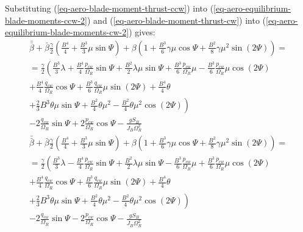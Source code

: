 Substituting (\ref{eq-aero-blade-moment-thrust-ccw}) into (\ref{eq-aero-equilibrium-blade-moments-ccw-2}) and (\ref{eq-aero-blade-moment-thrust-cw}) into (\ref{eq-aero-equilibrium-blade-moments-cw-2}) gives:
\begin{multline}
  \label{eq-aero-flapping-coefs-ccw-1}
  \bar{\bar \beta} + \bar \beta \frac{\gamma}{2}
  \left( \frac{B^4}{4} + \frac{B^3}{3} \mu \sin \Psi \right)
  + \beta \left(
    1 + \frac{B^3}{6} \gamma \mu \cos \Psi
    + \frac{B^2}{8} \gamma \mu^2 \sin \left( 2 \Psi \right)
  \right)
  = \\ =
  \frac{\gamma}{2}
  \left(
      \frac{B^3}{3} \lambda
    + \frac{B^4}{4} \frac{p_{cw}}{\Omega_R} \sin \Psi
    + \frac{B^2}{2} \lambda \mu \sin \Psi
    + \frac{B^3}{6} \frac{p_{cw}}{\Omega_R} \mu
    - \frac{B^3}{6} \frac{p_{cw}}{\Omega_R} \mu \cos \left( 2 \Psi \right)
    \right.
    \\
    + \frac{B^4}{4} \frac{q_{cw}}{\Omega_R} \cos \Psi
    + \frac{B^3}{6} \frac{q_{cw}}{\Omega_R} \mu \sin \left( 2 \Psi \right)
    + \frac{B^4}{4} \theta
    \\
    \left.
    + \frac{2}{3} B^3 \theta \mu \sin \Psi
    + \frac{B^2}{4} \theta \mu^2
    - \frac{B^2}{4} \theta \mu^2 \cos \left( 2 \Psi \right)
  \right)
  \\
  - 2 \frac{q_{cw}}{\Omega_R} \sin \Psi
  + 2 \frac{p_{cw}}{\Omega_R} \cos \Psi
  - \frac{ g S_B }{ J_B \Omega_R^2 }
\end{multline}
\begin{multline}
  \label{eq-aero-flapping-coefs-cw-1}
  \bar{\bar \beta} + \bar \beta \frac{\gamma}{2}
  \left( \frac{B^4}{4} + \frac{B^3}{3} \mu \sin \Psi \right)
  + \beta \left(
    1 + \frac{B^3}{6} \gamma \mu \cos \Psi
    + \frac{B^2}{8} \gamma \mu^2 \sin \left( 2 \Psi \right)
  \right)
  = \\ =
  \frac{\gamma}{2}
  \left(
      \frac{B^3}{3} \lambda
    - \frac{B^4}{4} \frac{p_{cw}}{\Omega_R} \sin \Psi
    + \frac{B^2}{2} \lambda \mu \sin \Psi
    - \frac{B^3}{6} \frac{p_{cw}}{\Omega_R} \mu
    + \frac{B^3}{6} \frac{p_{cw}}{\Omega_R} \mu \cos \left( 2 \Psi \right)
    \right.
    \\
    + \frac{B^4}{4} \frac{q_{cw}}{\Omega_R} \cos \Psi
    + \frac{B^3}{6} \frac{q_{cw}}{\Omega_R} \mu \sin \left( 2 \Psi \right)
    + \frac{B^4}{4} \theta
    \\
    \left.
    + \frac{2}{3} B^3 \theta \mu \sin \Psi
    + \frac{B^2}{4} \theta \mu^2
    - \frac{B^2}{4} \theta \mu^2 \cos \left( 2 \Psi \right)
  \right)
  \\
  - 2 \frac{q_{cw}}{\Omega_R} \sin \Psi
  - 2 \frac{p_{cw}}{\Omega_R} \cos \Psi
  - \frac{ g S_B }{ J_B \Omega_R^2 }
\end{multline}

